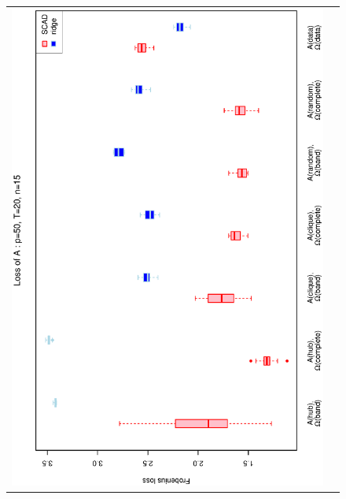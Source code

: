 \documentclass[a4paper]{article}
\begin{document}
\begin{figure}[h!]
\centering
\begin{tabular}{cc}
\includegraphics[scale=0.45,angle=270]{LossA50T20N15_5.eps}
\\

\end{tabular}
\end{figure}
\end{document}
